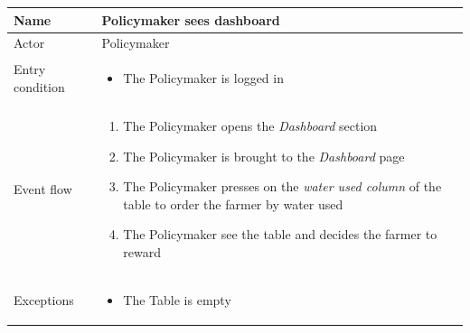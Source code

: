 \begin{table}[H]
    \begin{tabu} to \textwidth {|X|X[4]|}
        \hline
        Name            & Policymaker sees dashboard  \\ \hline
        Actor           & Policymaker                \\ \hline
        Entry condition & \begin{itemize}
            \item The Policymaker is logged in
        \end{itemize} \\ \hline
        Event flow      & \begin{enumerate}
            \item The Policymaker opens the \emph{Dashboard} section
            \item The Policymaker is brought to the \emph{Dashboard} page 
            \item The Policymaker presses on the \emph{water used column} of the table to order the farmer by water used 
            \item The Policymaker see the table and decides the farmer to reward
        \end{enumerate} \\ \hline
        Exceptions      & \begin{itemize}
            \item The Table is empty
        \end{itemize} \\ \hline
    \end{tabu}
\end{table}


